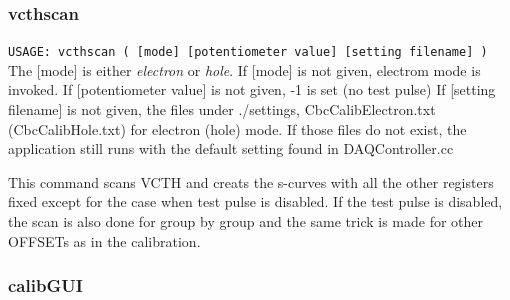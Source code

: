 \documentclass[11pt,a4paper]{article}
\begin{document}
		   \subsubsection{vcthscan}

		   \verb|USAGE: vcthscan ( [mode] [potentiometer value] [setting filename] )|\\
			   The [mode] is either {\it electron} or {\it hole}.
	If [mode] is not given, electrom mode is invoked. 
If [potentiometer value] is not given, -1 is set (no test pulse)
	If [setting filename] is not given, 
	the files under ./settings, CbcCalibElectron.txt (CbcCalibHole.txt) for electron (hole) mode.
	If those files do not exist, the application still runs with the default setting found in DAQController.cc

	This command scans VCTH and creats the s-curves with all the other registers fixed except for the case when test pulse is disabled. 
	If the test pulse is disabled, the scan is also done for group by group and the same trick is made for other OFFSETs as in the calibration. 

	\subsubsection{calibGUI}
\end{document}
